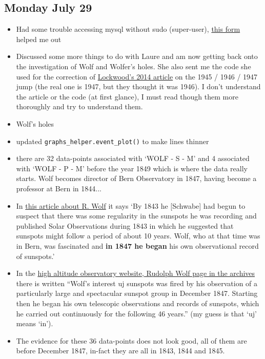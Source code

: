 \documentclass[12pt]{article}
\begin{document}
\subsection{Monday July 29}
\begin{itemize}
    \item Had some trouble accessing mysql without sudo (super-user), \href{https://askubuntu.com/questions/766334/cant-login-as-mysql-user-root-from-normal-user-account-in-ubuntu-16-04}{this form} helped me out
    \item Discussed some more things to do with Laure and am now getting back onto the investigation of Wolf and Wolfer's holes. She also sent me the code she used for the correction of \href{https://agupubs.onlinelibrary.wiley.com/doi/10.1002/2014JA019970}{Lockwood's 2014 article} on the 1945 / 1946 / 1947 jump (the real one is 1947, but they thought it was 1946). I don't understand the article or the code (at first glance), I must read though them more thoroughly and try to understand them.
    \item Wolf's holes
    \item updated \texttt{graphs\_helper.event\_plot()} to make lines thinner
    \item there are 32 data-points associated with `WOLF - S - M' and 4 associated with `WOLF - P - M' before the year 1849 which is where the data really starts. Wolf becomes director of Bern Observatory in 1847, having become a professor at Bern in 1844...
    \item In \href{http://www-history.mcs.st-andrews.ac.uk/Biographies/Wolf.html}{this article about R. Wolf} it says `By 1843 he [Schwabe] had begun to suspect that there was some regularity in the sunspots he was recording and published Solar Observations during 1843 in which he suggested that sunspots might follow a period of about 10 years. Wolf, who at that time was in Bern, was fascinated and \textbf{in 1847 he began} his own observational record of sunspots.'
    \item In the \href{https://web.archive.org/web/20091106184834/http://www.hao.ucar.edu/education/bios/wolf.php}{high altitude observatory website, Rudolph Wolf page in the archives} there is written ``Wolf's interest uj sunspots was fired by his observation of a particularly large and spectacular sunspot group in December 1847. Starting then he began his own telescopic observations and records of sunspots, which he carried out continuously for the following 46 years.'' (my guess is that `uj' means `in').
    \item The evidence for these 36 data-points does not look good, all of them are before December 1847, in-fact they are all in 1843, 1844 and 1845. 

\end{itemize}
\end{document}
